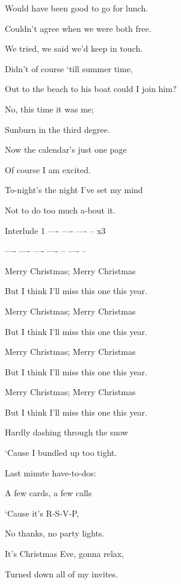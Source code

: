 Would have been good to go for lunch.

Couldn't agree when we were both free.

We tried, we said we'd keep in touch.

Didn't of course `till summer time,

Out to the beach to his boat could I join him?

No, this time it was me;

Sunburn in the third degree.

Now the calendar's just one page

Of course I am excited.

To-night's the night I've set my mind

Not to do too much a-bout it.  

Interlude 1  ----  ----  ----  --  x3

 ----  ----  ---- ----  --  ----  --  


Merry Christmas; Merry Christmas

But I think I'll miss this one this year.

Merry Christmas; Merry Christmas

But I think I'll miss this one this year.

Merry Christmas; Merry Christmas

But I think I'll miss this one this year.

Merry Christmas; Merry Christmas

But I think I'll miss this one this year.

Hardly dashing through the snow

`Cause I bundled up too tight.

Last minute have-to-dos:

A few cards, a few calls

`Cause it's R-S-V-P,

No thanks, no party lights.

It's Christmas Eve, gonna relax,

Turned down all of my invites.

